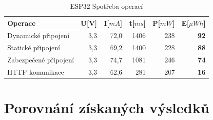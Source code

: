 \documentclass[a4paper, 12pt]{report}
\begin{document}
    \begin{table}[h]
        \centering
        \caption{ESP32 Spotřeba operací}
        \begin{tabular}{||l| r r r r |r||}
            \hline
            Operace               & U[V] & I[$mA$] & t[$ms$] & P[$mW$] & \textbf{E}[$\mu Wh$] \\
            \hline
            \hline
            Dynamické připojení   & 3,3  & 72,0    & 1406  & 238     & \textbf{92}          \\
            Statické připojení    & 3,3  & 69,2    & 1400  & 228     & \textbf{88}          \\
            Zabezpečené připojení & 3,3  & 74,7    & 1081  & 246     & \textbf{74}          \\
            HTTP komunikace       & 3,3  & 62,6    & 281   & 207     & \textbf{16}          \\
            \hline
        \end{tabular}
        \label{tab:esp32-spotreba-operaci}
    \end{table}


    \section{Porovnání získaných výsledků}
\end{document}
